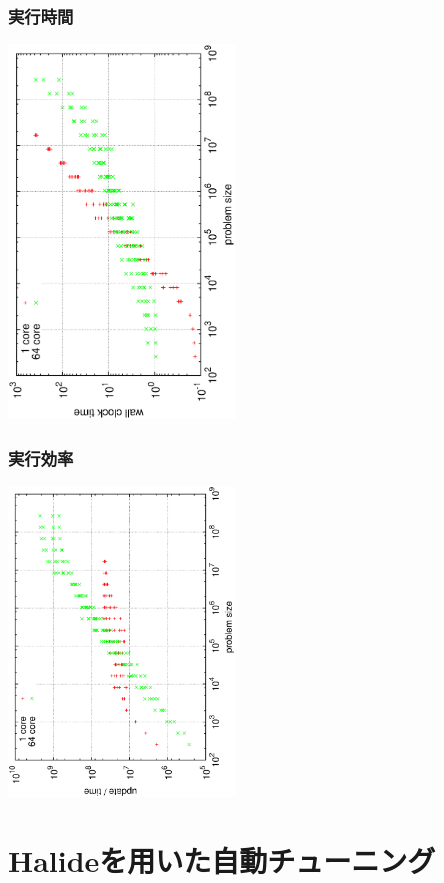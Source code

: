 \documentclass[dvipdfmx,cjk]{beamer}
\begin{document}
\begin{frame}[fragile]\frametitle{実行時間}
\begin{center}
\includegraphics[width=6cm,angle=270]{figure/result-wct.eps}
\end{center}
\end{frame}

\begin{frame}[fragile]\frametitle{実行効率}
\begin{center}
\includegraphics[width=6cm,angle=270]{figure/result-ef.eps}
\end{center}
\end{frame}

\section{Halideを用いた自動チューニング}
\end{document}

